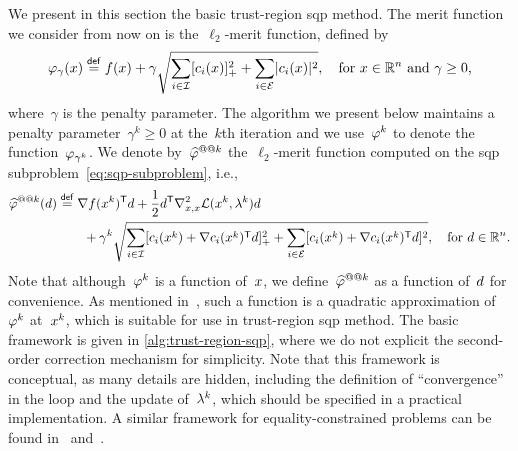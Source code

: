 We present in this section the basic trust-region \gls{sqp} method.
The merit function we consider from now on is the~$\ell_2$-merit function, defined by
\begin{equation*}
    \merit_{\gamma}(\iter) \eqdef \obj(\iter) + \gamma \sqrt{\sum_{i \in \iub} \posp{\con{i}(\iter)}^2 + \sum_{i \in \ieq} \abs{\con{i}(\iter)}^2}, \quad \text{for~$\iter \in \R^n$ and~$\gamma \ge 0$,}
\end{equation*}
where~$\gamma$ is the penalty parameter.
The algorithm we present below maintains a penalty parameter~$\gamma^k \ge 0$ at the~$k$th iteration and we use~$\merit[k]$ to denote the function~$\merit_{\gamma^k}$.
We denote by~$\meritm[k]$ the~$\ell_2$-merit function computed on the \gls{sqp} subproblem~\cref{eq:sqp-subproblem}, i.e.,
\begin{align*}
    \meritm[k](\step)   & \eqdef \nabla \obj(\iter[k])^{\T} \step + \frac{1}{2} \step^{\T} \nabla_{x, x}^2 \lag(\iter[k], \lm[k]) \step\\
                        & \qquad + \gamma^k \sqrt{\sum_{i \in \iub} \posp{\con{i}(\iter[k]) + \nabla \con{i}(\iter[k])^{\T} \step}^2 + \sum_{i \in \ieq} [\con{i}(\iter[k]) + \nabla \con{i}(\iter[k])^{\T} \step]^2}, \quad \text{for~$\step \in \R^n$.}
\end{align*}
Note that although~$\merit[k]$ is a function of~$\iter$, we define~$\meritm[k]$ as a function of~$\step$ for convenience.
As mentioned in~\cite[\S~15.3.2.1]{Conn_Gould_Toint_2000}, such a function is a quadratic approximation of~$\merit[k]$ at~$\iter[k]$, which is suitable for use in trust-region \gls{sqp} method.
The basic framework is given in \cref{alg:trust-region-sqp}, where we do not explicit the second-order correction mechanism for simplicity.
Note that this framework is conceptual, as many details are hidden, including the definition of \enquote{convergence} in the loop and the update of~$\lm[k]$, which should be specified in a practical implementation.
A similar framework for equality-constrained problems can be found in~\cite[\S~2]{Powell_Yuan_1991} and~\cite[Alg.~18.4]{Nocedal_Wright_2006}.

